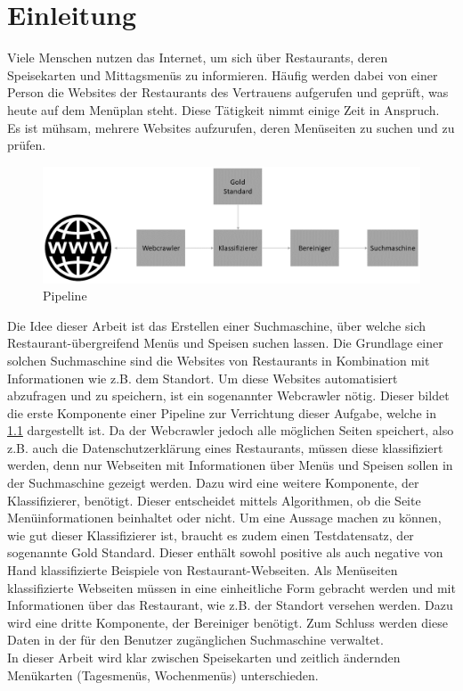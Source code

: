 \chapter{Einleitung}
Viele Menschen nutzen das Internet, um sich über Restaurants, deren Speisekarten und Mittagsmenüs zu informieren.
Häufig werden dabei von einer Person die Websites der Restaurants des Vertrauens aufgerufen und geprüft, was heute auf dem Menüplan steht.
Diese Tätigkeit nimmt einige Zeit in Anspruch.
Es ist mühsam, mehrere Websites aufzurufen, deren Menüseiten zu suchen und zu prüfen.\\
\begin{figure}[H]	
	\includegraphics[width=1\columnwidth,keepaspectratio]{img/Ablauf_Einleitung.png}
	\caption{Pipeline}
	\label{fig:ablauf_einleitung}
\end{figure}
Die Idee dieser Arbeit ist das Erstellen einer Suchmaschine, über welche sich Restaurant-übergreifend Menüs und Speisen suchen lassen.
Die Grundlage einer solchen Suchmaschine sind die Websites von Restaurants in Kombination mit Informationen wie z.B. dem Standort.
Um diese Websites automatisiert abzufragen und zu speichern, ist ein sogenannter Webcrawler nötig.
Dieser bildet die erste Komponente einer Pipeline zur Verrichtung dieser Aufgabe, welche in \cref{fig:ablauf_einleitung} dargestellt ist.
Da der Webcrawler jedoch alle möglichen Seiten speichert, also z.B. auch die Datenschutzerklärung eines Restaurants, müssen diese klassifiziert werden, denn nur Webseiten mit Informationen über Menüs und Speisen sollen in der Suchmaschine gezeigt werden.
Dazu wird eine weitere Komponente, der Klassifizierer, benötigt.
Dieser entscheidet mittels Algorithmen, ob die Seite Menüinformationen beinhaltet oder nicht.
Um eine Aussage machen zu können, wie gut dieser Klassifizierer ist, braucht es zudem einen Testdatensatz, der sogenannte Gold Standard.
Dieser enthält sowohl positive als auch negative von Hand klassifizierte Beispiele von Restaurant-Webseiten.
Als Menüseiten klassifizierte Webseiten müssen in eine einheitliche Form gebracht werden und mit Informationen über das Restaurant, wie z.B. der Standort versehen werden.
Dazu wird eine dritte Komponente, der Bereiniger benötigt.
Zum Schluss werden diese Daten in der für den Benutzer zugänglichen Suchmaschine verwaltet.\\
In dieser Arbeit wird klar zwischen Speisekarten und zeitlich ändernden Menükarten (Tagesmenüs, Wochenmenüs) unterschieden.   
